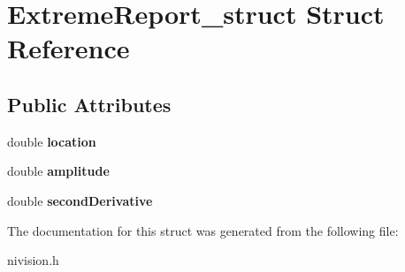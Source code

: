 \hypertarget{structExtremeReport__struct}{\section{\-Extreme\-Report\-\_\-struct \-Struct \-Reference}
\label{structExtremeReport__struct}
}
\subsection*{\-Public \-Attributes}
\begin{DoxyCompactItemize}
\item 
\hypertarget{structExtremeReport__struct_a549df186c5fda90d06abef6849daee2d}{double {\bfseries location}}\label{structExtremeReport__struct_a549df186c5fda90d06abef6849daee2d}

\item 
\hypertarget{structExtremeReport__struct_a5cacd498328984d1a2017539f6edb097}{double {\bfseries amplitude}}\label{structExtremeReport__struct_a5cacd498328984d1a2017539f6edb097}

\item 
\hypertarget{structExtremeReport__struct_a8387792d1f0bcb18aad85cf7728df9bb}{double {\bfseries second\-Derivative}}\label{structExtremeReport__struct_a8387792d1f0bcb18aad85cf7728df9bb}

\end{DoxyCompactItemize}


\-The documentation for this struct was generated from the following file\-:\begin{DoxyCompactItemize}
\item 
nivision.\-h\end{DoxyCompactItemize}
